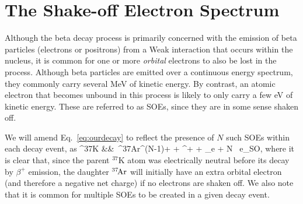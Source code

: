 


























\section{The Shake-off Electron Spectrum}
\label{section:soe_intro}
Although the beta decay process is primarily concerned with the emission of beta particles (electrons or positrons) from a Weak interaction that occurs within the nucleus, it is common for one or more \emph{orbital} electrons to also be lost in the process.  Although beta particles are emitted over a continuous energy spectrum, they commonly carry several MeV of kinetic energy.  By contrast, an atomic electron that becomes unbound in this process is likely to only carry a few eV of kinetic energy.  These are referred to as \acp{SOE}, since they are in some sense shaken off.

We will amend Eq.~\ref{eq:ourdecay} to reflect the presence of $N$ such \ac{SOE}s within each decay event, as
\bea
^{37}\textrm{K} &\rightarrow& \,^{37}\textrm{\!Ar}^{(N-1)+} + \beta^{+} + \nu_e + N \, e_{\textrm{SO}}, 
\label{eq:ourdecay_withsoe}
\eea
where it is clear that, since the parent $^{37}\textrm{K}$ atom was electrically neutral before its decay by $\beta^+$ emission, the daughter $^{37}\textrm{\!Ar}$ will initially have an extra
orbital electron (and therefore a negative net charge) if no electrons are shaken off.  We also note that it is common for multiple SOEs to be created in a given decay event.  

